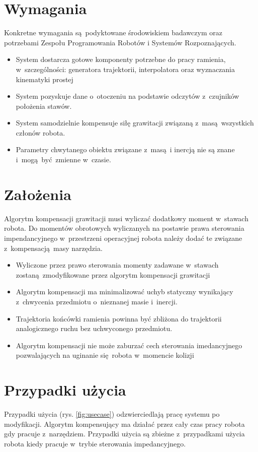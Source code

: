 \section{Wymagania}
Konkretne wymagania są podyktowane środowiskiem badawczym oraz potrzebami Zespołu Programowania Robotów i Systemów Rozpoznających. 
\begin{itemize}
	\item System dostarcza gotowe komponenty potrzebne do pracy ramienia, w~szczególności: generatora trajektorii, interpolatora oraz wyznaczania kinematyki prostej 
	\item System pozyskuje dane o~otoczeniu na podstawie odczytów z~czujników położenia stawów.
	\item System samodzielnie kompensuje siłę grawitacji związaną z~masą wszystkich członów robota.
	\item Parametry chwytanego obiektu związane z~masą i inercją nie są znane i~mogą być zmienne w~czasie.
\end{itemize}

\section{Założenia}
Algorytm kompensacji grawitacji musi wyliczać dodatkowy moment w~stawach robota. Do momentów obrotowych wyliczanych na postawie  prawa sterowania impendancyjnego w~przestrzeni operacyjnej robota należy dodać te związane z~kompensacją masy narzędzia.
\begin{itemize}
	\item Wyliczone przez prawo sterowania momenty zadawane w~stawach zostaną zmodyfikowane przez algorytm kompensacji grawitacji
	\item Algorytm kompensacji ma minimalizować uchyb statyczny wynikający z~chwycenia przedmiotu o~nieznanej masie i~inercji.
	\item  Trajektoria końcówki ramienia powinna być zbliżona do trajektorii analogicznego ruchu bez uchwyconego przedmiotu.
	\item Algorytm kompensacji nie może zaburzać cech sterowania imedancyjnego pozwalających na uginanie się robota w~momencie kolizji
\end{itemize}


\section{Przypadki użycia}
Przypadki użycia (rys. \ref{fig:usecase}) odzwierciedlają pracę systemu po modyfikacji. Algorytm kompensujący ma działać przez cały czas pracy robota gdy pracuje z~narzędziem. Przypadki użycia są zbieżne z~przypadkami użycia robota kiedy pracuje w~trybie sterowania impedancyjnego.

